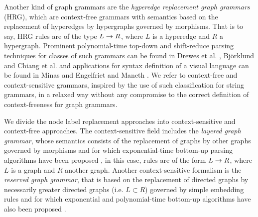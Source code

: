 Another kind of graph grammars are the \textit{hyperedge replacement graph grammars} (HRG), which are context-free grammars with semantics based on the replacement of hyperedges by hypergraphs \cite{drewes1997hyperedge} governed by morphisms. That is to say, HRG rules are of the type $L \to R$, where $L$ is a hyperedge and $R$ a hypergraph. Prominent polynomial-time top-down and shift-reduce parsing techniques for classes of such grammars can be found in Drewes et al. \cite{drewes2015predictive, drewes2017predictive}, Bj\"{o}rklund \cite{bjorklund2016between} and Chiang et al. \cite{chiang2013parsing} and applications for syntax definition of a visual language can be found in Minas \cite{minas2006syntax} and Engelfriet and Maneth \cite{engelfriet1998tree}. We refer to context-free and context-sensitive grammars, inspired by the use of such classification for string grammars, in a relaxed way without any compromise to the correct definition of context-freeness for graph grammars.

We divide the node label replacement approaches into context-sensitive and context-free approaches. The context-sensitive field includes the \textit{layered graph grammar}, whose semantics consists of the replacement of graphs by other graphs governed by morphisms \cite{rekers1997defining} and for which exponential-time bottom-up parsing algorithms have been proposed \cite{rekers1995graph,bottoni2000efficient,furst2011improving}, in this case, rules are of the form $L \to R$, where $L$ is a graph and $R$ another graph. Another context-sensitive formalism is the \textit{reserved graph grammar}, that is based on the replacement of directed graphs by necessarily greater directed graphs (i.e. $L \subset R$) governed by simple embedding rules \cite{zhang2001context} and for which exponential and polynomial-time bottom-up algorithms have also been proposed \cite{zeng2005rgg+,zou2017partial}.

